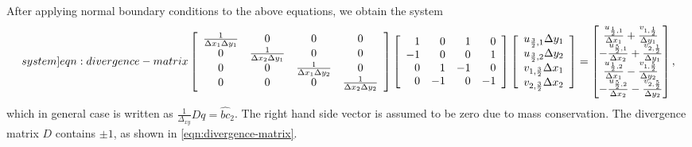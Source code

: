 \documentclass{article}
\numberwithin{equation}{section}
\begin{document}
After applying normal boundary conditions to the above equations, we obtain the system
\begin{equation}\label[system]{eqn:divergence-matrix}
\left[\begin{array}{cccc}
\frac{1}{\Delta x_1 \Delta y_1} & 0 & 0 & 0 \\
0 & \frac{1}{\Delta x_2 \Delta y_1} & 0 & 0 \\
0 & 0 & \frac{1}{\Delta x_1 \Delta y_2} & 0 \\
0 & 0 & 0 & \frac{1}{\Delta x_2 \Delta y_2}
\end{array}\right]\left[\begin{array}{rrrrrr}
1  & 0  & 1 & 0 \\
-1 & 0  & 0 & 1 \\
0 & 1  & -1 & 0 \\
0 & -1  & 0 & -1
\end{array}\right]\left[\begin{array}{l}
u_{\frac{3}{2},1} \Delta y_1 \\
u_{\frac{3}{2},2} \Delta y_2 \\
v_{1,\frac{3}{2}} \Delta x_1 \\
v_{2,\frac{3}{2}} \Delta x_2
\end{array}\right]=
\begin{bmatrix}{}
\frac{u_{\frac{1}{2},1}}{\Delta x_1}+\frac{v_{1,\frac{1}{2}}}{\Delta y_1} \\
-\frac{u_{\frac{5}{2},1}}{\Delta x_2}+\frac{v_{2,\frac{1}{2}}}{\Delta y_1} \\
\frac{u_{\frac{1}{2},2}}{\Delta x_1}-\frac{v_{1,\frac{5}{2}}}{\Delta y_2} \\
-\frac{u_{\frac{5}{2},2}}{\Delta x_2}-\frac{v_{2,\frac{5}{2}}}{\Delta y_2}
\end{bmatrix},
\end{equation}
which in general case is written as 
$\frac{1}{\Delta_{xy}} D q=\hat{bc}_2$.
The right hand side vector is assumed to be zero due to mass conservation. The divergence matrix $D$ contains $\pm1$, as shown in \cref{eqn:divergence-matrix}. 

\end{document}
